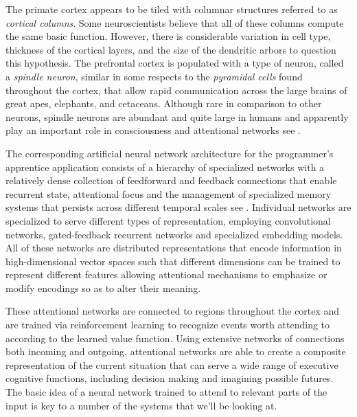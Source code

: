 The primate cortex appears to be tiled with columnar structures referred to as {\it{cortical columns}}. Some neuroscientists believe that all of these columns compute the same basic function. However, there is considerable variation in cell type, thickness of the cortical layers, and the size of the dendritic arbors to question this hypothesis. The prefrontal cortex is populated with a type of neuron, called a {\it{spindle neuron}}, similar in some respects to the {\it{pyramidal cells}} found throughout the cortex, that allow rapid communication across the large brains of great apes, elephants, and cetaceans. Although rare in comparison to other neurons, spindle neurons are abundant and quite large in humans and apparently play an important role in consciousness and attentional networks \emdash{} see {{}}.

The corresponding artificial neural network architecture for the programmer's apprentice application consists of a hierarchy of specialized networks with a relatively dense collection of feedforward and feedback connections that enable recurrent state, attentional focus and the management of specialized memory systems that persists across different temporal scales \emdash{} see {{}}. Individual networks are specialized to serve different types of representation, employing convolutional networks, gated-feedback recurrent networks and specialized embedding models. All of these networks are distributed representations that encode information in high-dimensional vector spaces such that different dimensions can be trained to represent different features allowing attentional mechanisms to emphasize or modify encodings so as to alter their meaning.

These attentional networks are connected to regions throughout the cortex and are trained via reinforcement learning to recognize events worth attending to according to the learned value function. Using extensive networks of connections \emdash{} both incoming and outgoing, attentional networks are able to create a composite representation of the current situation that can serve a wide range of executive cognitive functions, including decision making and imagining possible futures. The basic idea of a neural network trained to attend to relevant parts of the input is key to a number of the systems that we'll be looking at.

